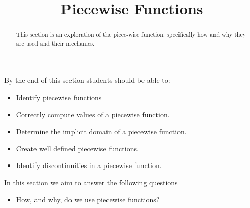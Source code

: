 \documentclass{ximera}
\title{Piecewise Functions}
\begin{document}
\begin{abstract}
    This section is an exploration of the piece-wise function; specifically how and why they are used and their mechanics.
\end{abstract}
\maketitle
By the end of this section students should be able to:

\begin{itemize}
    \item Identify piecewise functions
    \item Correctly compute values of a piecewise function.
    \item Determine the implicit domain of a piecewise function.
    \item Create well defined piecewise functions.
    \item Identify discontinuities in a piecewise function.
\end{itemize}


In this section we aim to answer the following questions

\begin{itemize}
    \item How, and why, do we use piecewise functions?
\end{itemize}
\end{document}
